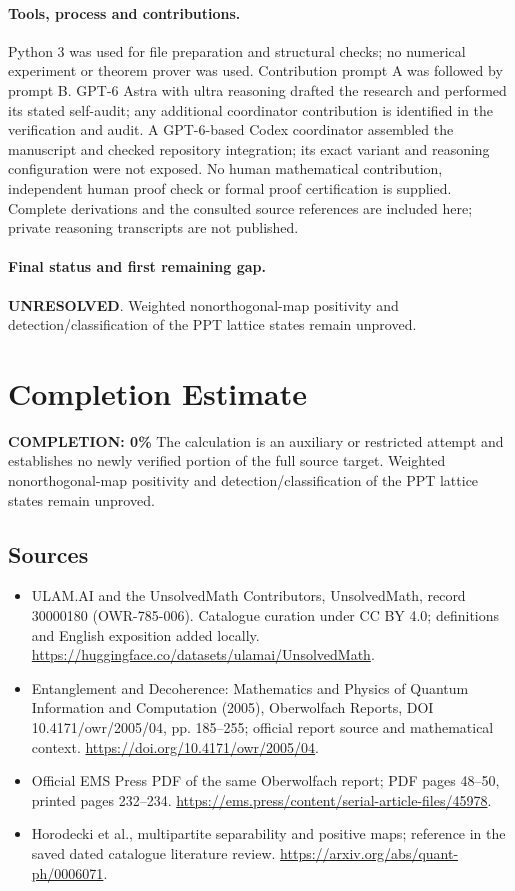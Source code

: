 \documentclass[11pt]{article}
\begin{document}
\paragraph{Tools, process and contributions.}
Python 3 was used for file preparation and structural checks; no numerical experiment or theorem prover was used. Contribution prompt A was followed by prompt B. GPT-6 Astra with ultra reasoning drafted the research and performed its stated self-audit; any additional coordinator contribution is identified in the verification and audit. A GPT-6-based Codex coordinator assembled the manuscript and checked repository integration; its exact variant and reasoning configuration were not exposed. No human mathematical contribution, independent human proof check or formal proof certification is supplied. Complete derivations and the consulted source references are included here; private reasoning transcripts are not published.

\paragraph{Final status and first remaining gap.}
\textbf{UNRESOLVED}. Weighted nonorthogonal-map positivity and detection/classification of the PPT lattice states remain unproved.

\section{Completion Estimate}
\noindent\textbf{COMPLETION: 0\%}
The calculation is an auxiliary or restricted attempt and establishes no newly verified portion of the full source target. Weighted nonorthogonal-map positivity and detection/classification of the PPT lattice states remain unproved.

\subsection{Sources}
\begin{itemize}
\item[\hypertarget{source:30000180:1}{S1}] ULAM.AI and the UnsolvedMath Contributors, UnsolvedMath, record 30000180 (OWR-785-006). Catalogue curation under CC BY 4.0; definitions and English exposition added locally.
\url{https://huggingface.co/datasets/ulamai/UnsolvedMath}.
\item[\hypertarget{source:30000180:2}{S2}] Entanglement and Decoherence: Mathematics and Physics of Quantum Information and Computation (2005), Oberwolfach Reports, DOI 10.4171/owr/2005/04, pp. 185--255; official report source and mathematical context.
\url{https://doi.org/10.4171/owr/2005/04}.
\item[\hypertarget{source:30000180:3}{S3}] Official EMS Press PDF of the same Oberwolfach report; PDF pages 48--50, printed pages 232--234.
\url{https://ems.press/content/serial-article-files/45978}.
\item[\hypertarget{source:30000180:4}{S4}] Horodecki et al., multipartite separability and positive maps; reference in the saved dated catalogue literature review.
\url{https://arxiv.org/abs/quant-ph/0006071}.
\end{itemize}
\label{end:30000180}
\end{document}
